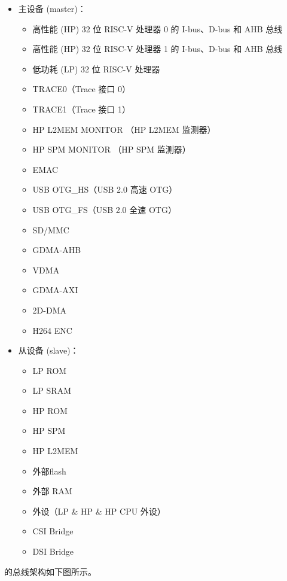 \documentclass[main\_\_CN.tex]{subfiles}
\begin{document}
\begin{itemize}
    \item 主设备 (master)：
        \begin{itemize}
            \item 高性能 (HP) 32 位 RISC-V 处理器 0 的 I-bus、D-bus 和 AHB 总线
            \item 高性能 (HP) 32 位 RISC-V 处理器 1 的 I-bus、D-bus 和 AHB 总线
            \item 低功耗 (LP) 32 位 RISC-V 处理器
            \item TRACE0（Trace 接口 0）
            \item TRACE1（Trace 接口 1）
            \item HP L2MEM MONITOR （HP L2MEM 监测器）
            \item HP SPM MONITOR （HP SPM 监测器）
            \item EMAC
            \item USB OTG\_HS（USB 2.0 高速 OTG）
            \item USB OTG\_FS（USB 2.0 全速 OTG）
            \item SD/MMC
            \item GDMA-AHB
            \item VDMA
            \item GDMA-AXI
            \item 2D-DMA
            \item H264 ENC
        \end{itemize}
    \item 从设备 (slave)：
        \begin{itemize}
            \item LP ROM
            \item LP SRAM
            \item HP ROM
            \item HP SPM
            \item HP L2MEM
            \item 外部flash
            \item 外部 RAM
            \item 外设（LP \& HP \& HP CPU 外设）
            \item CSI Bridge
            \item DSI Bridge
        \end{itemize}
\end{itemize}

\chipname{} 的总线架构如下图所示。
\end{document}
